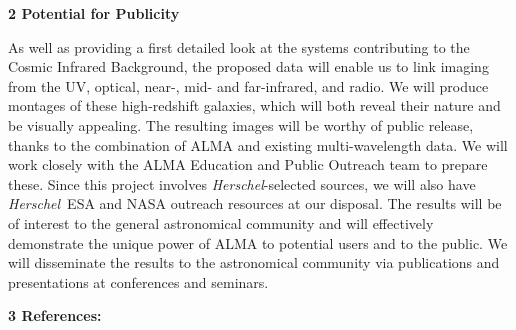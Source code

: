 \documentclass[12pt,a4paper]{article}
\newcommand{\herschel}{{\it Herschel}}
\newcommand{\micron}{$\mu$m}
\begin{document}
{\large{\bf 2 Potential for Publicity}}



As well as providing a first detailed look at the
systems contributing to the Cosmic Infrared Background, the proposed
data will enable us to link imaging from the UV, optical, near-, mid-
and far-infrared, and radio. We will produce montages of these
high-redshift galaxies, which will both reveal their nature and be
visually appealing. The resulting images will be worthy of public release,
thanks to the combination of ALMA and existing
multi-wavelength data.  We
will work closely with the ALMA Education and Public Outreach team to
prepare these. Since this project involves \herschel-selected sources,
we will also have \herschel\ ESA and NASA outreach resources at our
disposal. The results will be of interest to the general astronomical
community and will effectively demonstrate the unique power of ALMA to
potential users and to the public.  We will disseminate the results to
the astronomical community via publications and presentations at
conferences and seminars.


{\large{\bf 3 References:}}
\end{document}
